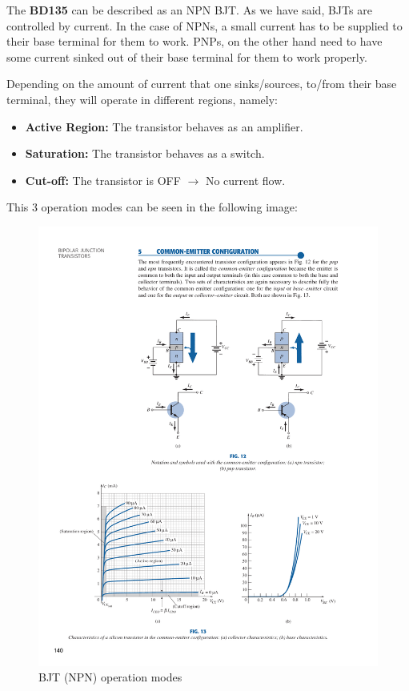 The \textbf{BD135} can be described as an NPN BJT. As we have said, BJTs are controlled by current. In the case of NPNs, a small current has to be supplied to their base terminal for them to work. PNPs, on the other hand need to have some current sinked out of their base terminal for them to work properly.\medskip

\clearpage

Depending on the amount of current that one sinks/sources, to/from their base terminal, they will operate in different regions, namely:

\begin{itemize}
    \item \textbf{Active Region:} The transistor behaves as an amplifier. 
    \item \textbf{Saturation:} The transistor behaves as a switch.
    \item \textbf{Cut-off:} The transistor is OFF $\rightarrow$ No current flow.
\end{itemize}

This 3 operation modes can be seen in the following image:

\begin{figure}[H]
    \centering
    \includegraphics[width = \textwidth]{Graphics/Practice 8/BJT/IC_VCE.pdf}
    \caption{BJT (NPN) operation modes~\autocite{BOYLESTAD}}
    \label{fig:BJT_MODES}
\end{figure}


